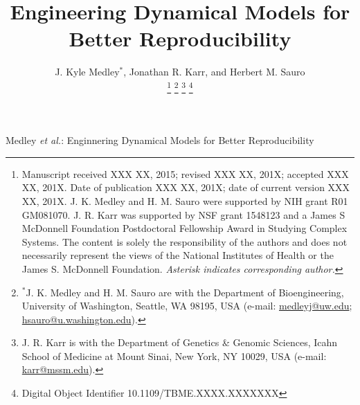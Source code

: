 \documentclass[journal,transmag,twoside]{IEEEtran}
\newcommand{\email}[1]{\href{mailto:#1}{#1}}
\begin{document}
\title{Engineering Dynamical Models for Better Reproducibility}

\author{
    J. Kyle Medley$^*$,
	Jonathan R. Karr, and
	Herbert M. Sauro
    
    \thanks{
        Manuscript received XXX XX, 2015; revised XXX XX, 201X; accepted XXX XX, 201X. Date of publication XXX XX, 201X; date of current version XXX XX, 201X.
        J. K. Medley and H. M. Sauro were supported by NIH grant R01 GM081070. J. R. Karr was supported by NSF grant 1548123 and a James S McDonnell Foundation Postdoctoral Fellowship Award in Studying Complex Systems. The content is solely the responsibility of the authors and does not necessarily represent the views of the National Institutes of Health or the James S. McDonnell Foundation.
        \textit{Asterisk indicates corresponding author.}
    }
    \thanks{$^*$J. K. Medley and H. M. Sauro are with the Department of Bioengineering, University of Washington, Seattle, WA 98195, USA (e-mail: \email{medleyj@uw.edu}; \email{hsauro@u.washington.edu}).}
    \thanks{J. R. Karr is with the Department of Genetics \& Genomic Sciences, Icahn School of Medicine at Mount Sinai, New York, NY 10029, USA (e-mail: \email{karr@mssm.edu}).}
    \thanks{Digital Object Identifier 10.1109/TBME.XXXX.XXXXXXX}
}

%
{Medley \MakeLowercase{\textit{et al.}}: Enginnering Dynamical Models for Better Reproducibility}
% 








\maketitle
\end{document}
